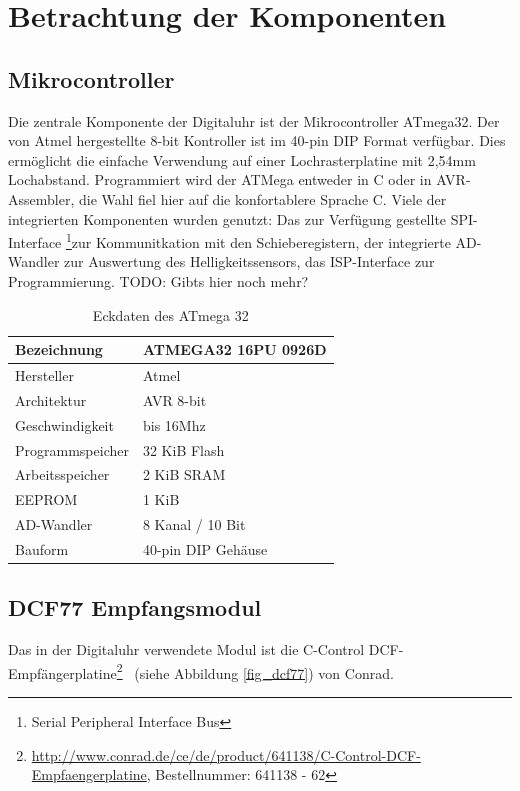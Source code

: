 \section{Betrachtung der Komponenten}
\subsection{Mikrocontroller}
Die zentrale Komponente der Digitaluhr ist der Mikrocontroller ATmega32. Der von Atmel hergestellte 8-bit Kontroller ist im 40-pin DIP Format verfügbar. Dies ermöglicht die einfache Verwendung auf einer Lochrasterplatine mit 2,54mm Lochabstand. Programmiert wird der ATMega entweder in C oder in AVR-Assembler, die Wahl fiel hier auf die konfortablere Sprache C.
Viele der integrierten Komponenten wurden genutzt: Das zur Verfügung gestellte SPI-Interface \footnote{Serial Peripheral Interface Bus}zur Kommunitkation mit den Schieberegistern, der integrierte AD-Wandler zur Auswertung des Helligkeitssensors, das ISP-Interface zur Programmierung. TODO: Gibts hier noch mehr?
\begin{table}[htp]
  \centering
  \renewcommand{\arraystretch}{1.2}
  \begin{tabular}{||l | l||}
  \hline\hline
  Bezeichnung&ATMEGA32 16PU 0926D\\\hline
  Hersteller&Atmel\\\hline
  Architektur&AVR 8-bit \\\hline
  Geschwindigkeit&bis 16Mhz \\\hline
  Programmspeicher&32 KiB Flash \\\hline
  Arbeitsspeicher&2 KiB SRAM \\\hline
  EEPROM&1 KiB \\\hline
  AD-Wandler&8 Kanal / 10 Bit \\\hline
  Bauform&40-pin DIP Gehäuse \\
  \hline\hline    
\end{tabular}
\caption{Eckdaten des ATmega 32}
\end{table}

\subsection{DCF77 Empfangsmodul}\label{sec_dcf77modul}
Das in der Digitaluhr verwendete Modul ist die \glqq C-Control DCF-Empfängerplatine\qrqq\footnote{\url{http://www.conrad.de/ce/de/product/641138/C-Control-DCF-Empfaengerplatine}, Bestellnummer: 641138 - 62}~ (siehe Abbildung \ref{fig_dcf77}) von Conrad.

